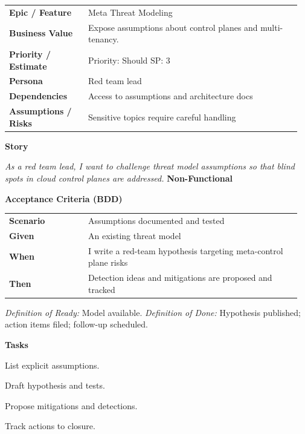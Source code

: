 \documentclass[11pt,letterpaper]{article}
\makeatletter
\newenvironment{kvtable}{%
  \begin{tabular}{@{}>{\bfseries\arraybackslash}p{0.26\linewidth} p{0.70\linewidth}@{}}
}{\end{tabular}}
\newenvironment{bdd}{%
  \begin{tabular}{@{}>{\bfseries\arraybackslash}p{0.26\linewidth} p{0.70\linewidth}@{}}
}{\end{tabular}}
\newcommand{\DoRDoD}[2]{%
  \vspace{0.35em}
  {\footnotesize\color{Muted}%
    \textit{Definition of Ready:} #1 \; \textbullet\;
    \textit{Definition of Done:} #2%
  }%
}
\newenvironment{storycard}[2]{%
  \begin{tcolorbox}[cloudcard, title={#1 --- #2}]%
}{\end{tcolorbox}}
\newcommand{\sectionlabel}[1]{\vspace{0.35em}\textbf{#1}\par}
\makeatother
\begin{document}
\begin{storycard}{CCS-33}{Ch. 33 — Critical Analysis of Threat Models}
\begin{kvtable}
Epic / Feature & Meta Threat Modeling\\
Business Value & Expose assumptions about control planes and multi-tenancy.\\
Priority / Estimate & Priority: Should \quad SP: 3\\
Persona & Red team lead\\
Dependencies & Access to assumptions and architecture docs\\
Assumptions / Risks & Sensitive topics require careful handling\\
\end{kvtable}
\sectionlabel{Story}
\textit{As a red team lead, I want to challenge threat model assumptions so that blind spots in cloud control planes are addressed.}
\sectionlabel{Non-Functional}\;
\sectionlabel{Acceptance Criteria (BDD)}
\begin{bdd}
Scenario & Assumptions documented and tested\\
Given & An existing threat model\\
When & I write a red-team hypothesis targeting meta-control plane risks\\
Then & Detection ideas and mitigations are proposed and tracked\\
\end{bdd}
\DoRDoD{Model available.}{Hypothesis published; action items filed; follow-up scheduled.}
\sectionlabel{Tasks}
\begin{checklist}
\item List explicit assumptions.
\item Draft hypothesis and tests.
\item Propose mitigations and detections.
\item Track actions to closure.
\end{checklist}
\end{storycard}
\end{document}
